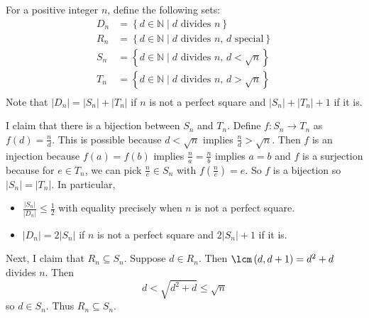 For a positive integer $n$, define the following sets:
\begin{align*}
	D_n&=\left\{d\in\mathbb{N}\mid d\text{ divides }n\right\}\\
	R_n&=\left\{d\in\mathbb{N}\mid d\text{ divides }n\text{, }d\text{ special}\right\}\\
	S_n&=\left\{d\in\mathbb{N}\mid d\text{ divides }n\text{, }d<\sqrt{n}\right\}\\
	T_n&=\left\{d\in\mathbb{N}\mid d\text{ divides }n\text{, }d>\sqrt{n}\right\}\\
\end{align*}
Note that $\left|D_n\right|=\left|S_n\right|+\left|T_n\right|$ if $n$ is not a perfect square and $\left|S_n\right|+\left|T_n\right|+1$ if it is.

I claim that there is a bijection between $S_n$ and $T_n$. Define $f:S_n\to T_n$ as $f\left(d\right)=\frac{n}{d}$. This is possible because $d<\sqrt{n}$ implies $\frac{n}{d}>\sqrt{n}$. Then $f$ is an injection because $f\left(a\right)=f\left(b\right)$ implies $\frac{n}{a}=\frac{n}{b}$ implies $a=b$ and $f$ is a surjection because for $e\in T_n$, we can pick $\frac{n}{e}\in S_n$ with $f\left(\frac{n}{e}\right)=e$. So $f$ is a bijection so $\left|S_n\right|=\left|T_n\right|$. In particular,
\begin{itemize}
	\item $\frac{\left|S_n\right|}{\left|D_n\right|}\leq\frac{1}{2}$ with equality precisely when $n$ is not a perfect square.
	\item $\left|D_n\right|=2\left|S_n\right|$ if $n$ is not a perfect square and $2\left|S_n\right|+1$ if it is.
\end{itemize}

Next, I claim that $R_n\subseteq S_n$. Suppose $d\in R_n$. Then $\lcm\left(d,d+1\right)=d^2+d$ divides $n$. Then \[d<\sqrt{d^2+d}\leq\sqrt{n}\] so $d\in S_n$. Thus $R_n\subseteq S_n$.

